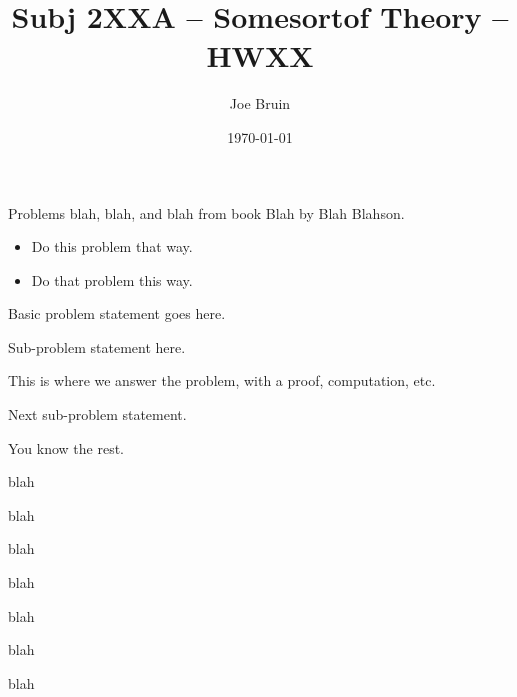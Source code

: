 \documentclass[12pt]{article} %
\title{Subj 2XXA -- Somesortof Theory -- HWXX}
\author{Joe Bruin}
\date{\today} %
\begin{document}
\maketitle



\begin{em}
Problems blah, blah, and blah from book Blah by Blah Blahson.
\begin{itemize}
\item Do this problem that way. 
\item Do that problem this way. 
\end{itemize}
\end{em}



\HWproblemSec[subtitle]
\begin{HWproblemState}
Basic problem statement goes here. 
\end{HWproblemState}


\begin{HWproblemEnum}

\item %
\begin{HWproblemState}
Sub-problem statement here. 
\end{HWproblemState}

This is where we answer the problem, with a proof, computation, etc. 


\item %
\begin{HWproblemState}
Next sub-problem statement. 
\end{HWproblemState}

You know the rest. 


\item %
\begin{HWproblemState}
blah
\end{HWproblemState}

blah

\end{HWproblemEnum}



\HWproblemSec%
\begin{HWproblemState}
blah
\end{HWproblemState}


\begin{HWproblemEnum}

\item %
\begin{HWproblemState}
blah
\end{HWproblemState}

blah


\item %
\begin{HWproblemState}
blah
\end{HWproblemState}

blah

\end{HWproblemEnum}



\end{document}
